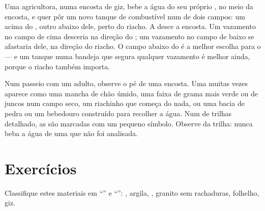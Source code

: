 \begin{example}\label{ex:g6:water-underground:tank}
Uma agricultora, numa encosta de giz, bebe a água do seu próprio , no
meio da encosta, e quer pôr um novo tanque de combustível num de dois
campos: um acima do , outro abaixo dele, perto do riacho. A  desce a encosta. Um vazamento no campo de cima desceria na
direção do ; um vazamento no campo de baixo se afastaria dele, na
direção do riacho. O campo abaixo do  é a melhor escolha para o 
--- e um tanque numa bandeja que segura qualquer vazamento é melhor ainda,
porque o riacho também importa.
\end{example}

\begin{inthefield}
Num passeio com um adulto, observe o pé de uma encosta. Uma  muitas
vezes aparece como uma mancha de chão úmido, uma faixa de grama mais verde
ou de juncos num campo seco, um riachinho que começa do nada, ou uma bacia
de pedra ou um bebedouro construído para recolher a água. Num  de
trilhas detalhado, as  são marcadas com um pequeno símbolo. Observe
da trilha: nunca beba a água de uma  que não foi analisada.
\end{inthefield}

\section{Exercícios}

\begin{exercise}[$\star$]\label{exo:g6:water-underground:1}
Classifique estes materiais em ``'' e ``'': ,
argila, , granito sem rachaduras, folhelho, giz.
\end{exercise}

